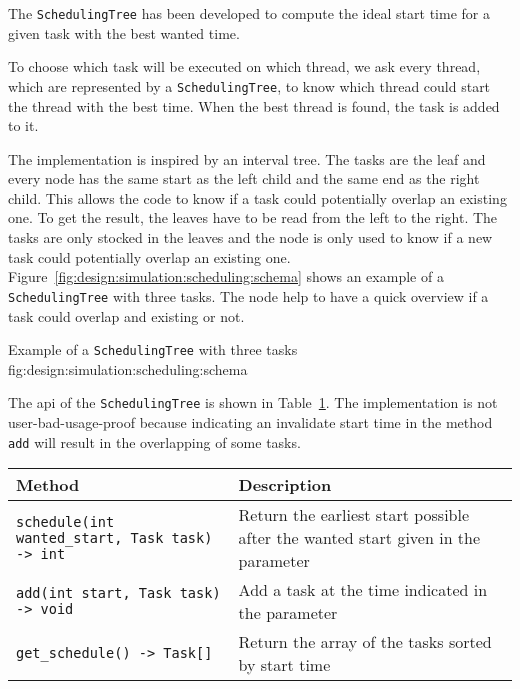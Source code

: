 The \texttt{SchedulingTree} has been developed to compute the ideal start time
for a given task with the best wanted time.

To choose which task will be executed on which thread, we ask every thread,
which are represented by a \texttt{SchedulingTree}, to know which thread could
start the thread with the best time.
When the best thread is found, the task is added to it.

The implementation is inspired by an interval tree.
The tasks are the leaf and every node has the same start as the left child and
the same end as the right child.
This allows the code to know if a task could potentially overlap an existing one.
To get the result, the leaves have to be read from the left to the right.
The tasks are only stocked in the leaves and the node is only used to know if a
new task could potentially overlap an existing one.
Figure~\ref{fig:design:simulation:scheduling:schema} shows an example of a
\texttt{SchedulingTree} with three tasks.
The node help to have a quick overview if a task could overlap and existing or
not.

        {Example of a \texttt{SchedulingTree} with three tasks}
        {fig:design:simulation:scheduling:schema}

The \acrshort{api} of the \texttt{SchedulingTree} is shown in Table~\ref{tab:design:simulation:scheduling:api}.
The implementation is not user-bad-usage-proof because indicating an invalidate
start time in the method \texttt{add} will result in the overlapping of some
tasks.

\begin{table}[ht]
    \centering
    \begin{tabular}{|m{}|m{}|}
        \hline
        \textbf{Method} & \textbf{Description} \\
        \hline
        \texttt{schedule(int wanted\_start, Task task) -> int} & Return the earliest start possible after the wanted start given in the parameter \\
        \hline
        \texttt{add(int start, Task task) -> void} & Add a task at the time indicated in the parameter \\
        \hline
        \texttt{get\_schedule() -> Task[]} & Return the array of the tasks sorted by start time \\
        \hline
    \end{tabular}
    \label{tab:design:simulation:scheduling:api}
\end{table}

